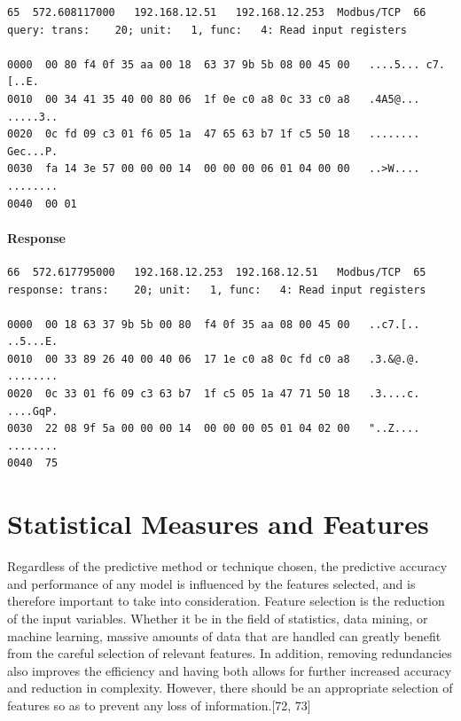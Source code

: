 \documentclass[11pt,]{article}
\begin{document}
\begin{verbatim}
65  572.608117000   192.168.12.51   192.168.12.253  Modbus/TCP  66
query: trans:    20; unit:   1, func:   4: Read input registers

0000  00 80 f4 0f 35 aa 00 18  63 37 9b 5b 08 00 45 00   ....5... c7.[..E.
0010  00 34 41 35 40 00 80 06  1f 0e c0 a8 0c 33 c0 a8   .4A5@... .....3..
0020  0c fd 09 c3 01 f6 05 1a  47 65 63 b7 1f c5 50 18   ........ Gec...P.
0030  fa 14 3e 57 00 00 00 14  00 00 00 06 01 04 00 00   ..>W.... ........
0040  00 01    
\end{verbatim}

\paragraph{Response}\label{response}

\begin{verbatim}
66  572.617795000   192.168.12.253  192.168.12.51   Modbus/TCP  65
response: trans:    20; unit:   1, func:   4: Read input registers

0000  00 18 63 37 9b 5b 00 80  f4 0f 35 aa 08 00 45 00   ..c7.[.. ..5...E.
0010  00 33 89 26 40 00 40 06  17 1e c0 a8 0c fd c0 a8   .3.&@.@. ........
0020  0c 33 01 f6 09 c3 63 b7  1f c5 05 1a 47 71 50 18   .3....c. ....GqP.
0030  22 08 9f 5a 00 00 00 14  00 00 00 05 01 04 02 00   "..Z.... ........
0040  75
\end{verbatim}

\newpage

\section{Statistical Measures and
Features}\label{statistical-measures-and-features}

Regardless of the predictive method or technique chosen, the predictive
accuracy and performance of any model is influenced by the features
selected, and is therefore important to take into consideration. Feature
selection is the reduction of the input variables. Whether it be in the
field of statistics, data mining, or machine learning, massive amounts
of data that are handled can greatly benefit from the careful selection
of relevant features. In addition, removing redundancies also improves
the efficiency and having both allows for further increased accuracy and
reduction in complexity. However, there should be an appropriate
selection of features so as to prevent any loss of information.{[}72,
73{]}
\end{document}
